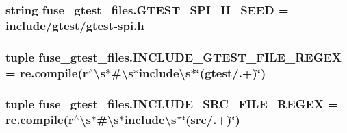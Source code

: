 \subsubsection[{G\+T\+E\+S\+T\+\_\+\+S\+P\+I\+\_\+\+H\+\_\+\+S\+E\+E\+D}]{\setlength{\rightskip}{0pt plus 5cm}string fuse\+\_\+gtest\+\_\+files.\+G\+T\+E\+S\+T\+\_\+\+S\+P\+I\+\_\+\+H\+\_\+\+S\+E\+E\+D = \textquotesingle{}include/gtest/gtest-\/spi.\+h\textquotesingle{}}\label{namespacefuse__gtest__files_a891d03ce9cfe3577cb4c193f9544f17f}
\hypertarget{namespacefuse__gtest__files_a726853d43863f4f03df04d2fbc3e5d12}{}
\subsubsection[{I\+N\+C\+L\+U\+D\+E\+\_\+\+G\+T\+E\+S\+T\+\_\+\+F\+I\+L\+E\+\_\+\+R\+E\+G\+E\+X}]{\setlength{\rightskip}{0pt plus 5cm}tuple fuse\+\_\+gtest\+\_\+files.\+I\+N\+C\+L\+U\+D\+E\+\_\+\+G\+T\+E\+S\+T\+\_\+\+F\+I\+L\+E\+\_\+\+R\+E\+G\+E\+X = re.\+compile(r\textquotesingle{}$^\wedge$\textbackslash{}s$\ast$\#\textbackslash{}s$\ast$include\textbackslash{}s$\ast$\char`\"{}(gtest/.+)\char`\"{}\textquotesingle{})}\label{namespacefuse__gtest__files_a726853d43863f4f03df04d2fbc3e5d12}
\hypertarget{namespacefuse__gtest__files_ada118f67eab8eccd71bfac9e6508245b}{}
\subsubsection[{I\+N\+C\+L\+U\+D\+E\+\_\+\+S\+R\+C\+\_\+\+F\+I\+L\+E\+\_\+\+R\+E\+G\+E\+X}]{\setlength{\rightskip}{0pt plus 5cm}tuple fuse\+\_\+gtest\+\_\+files.\+I\+N\+C\+L\+U\+D\+E\+\_\+\+S\+R\+C\+\_\+\+F\+I\+L\+E\+\_\+\+R\+E\+G\+E\+X = re.\+compile(r\textquotesingle{}$^\wedge$\textbackslash{}s$\ast$\#\textbackslash{}s$\ast$include\textbackslash{}s$\ast$\char`\"{}(src/.+)\char`\"{}\textquotesingle{})}\label{namespacefuse__gtest__files_ada118f67eab8eccd71bfac9e6508245b}
